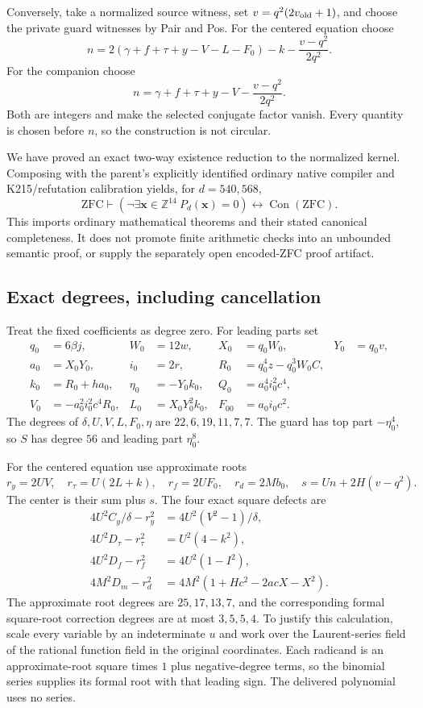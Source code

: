 Conversely, take a normalized source witness, set
$v=q^2(2v_{\rm old}+1)$, and choose the private guard witnesses by Pair
and Pos. For the centered equation choose
\[
 n=2(\gamma+f+\tau+y-V-L-F_0)-k
        -\frac{v-q^2}{2q^2}.
\]
For the companion choose
\[
 n=\gamma+f+\tau+y-V-\frac{v-q^2}{2q^2}.
\]
Both are integers and make the selected conjugate factor vanish. Every
quantity is chosen before $n$, so the construction is not circular.

We have proved an exact two-way existence reduction to the normalized
kernel. Composing with the parent's explicitly identified ordinary native
compiler and K215/refutation calibration yields, for $d=540,568$,
\[
 \mathrm{ZFC}\vdash
 \left(\neg\exists\boldsymbol x\in\mathbb Z^{14}
              \ P_d(\boldsymbol x)=0\right)
 \longleftrightarrow\operatorname{Con}(\mathrm{ZFC}).
\]
This imports ordinary mathematical theorems and their stated canonical
completeness. It does not promote finite arithmetic checks into an unbounded
semantic proof, or supply the separately open encoded-ZFC proof artifact.

\subsection{Exact degrees, including cancellation}

Treat the fixed coefficients as degree zero. For leading parts set
\begin{align*}
 q_0&=6\beta j,&W_0&=12w,&X_0&=q_0W_0,&Y_0&=q_0v,\\
 a_0&=X_0Y_0,&i_0&=2r,&R_0&=q_0^4z-q_0^3W_0C,\\
 k_0&=R_0+ha_0,&\eta_0&=-Y_0k_0,&Q_0&=a_0^4i_0^2c^4,\\
 V_0&=-a_0^2i_0^2c^4R_0,&L_0&=X_0Y_0^2k_0,&F_{00}&=a_0i_0c^2.
\end{align*}
The degrees of $\delta,U,V,L,F_0,\eta$ are $22,6,19,11,7,7$.
The guard has top part $-\eta_0^4$, so $S$ has degree $56$ and
leading part $\eta_0^8$.

For the centered equation use approximate roots
\[
 r_y=2UV,\quad r_\tau=U(2L+k),\quad
 r_f=2UF_0,\quad r_d=2Mb_0,
 \quad s=Un+2H(v-q^2).
\]
The center is their sum plus $s$. The four exact square defects are
\begin{align*}
 4U^2C_y/\delta-r_y^2&=4U^2(V^2-1)/\delta,\\
 4U^2D_\tau-r_\tau^2&=U^2(4-k^2),\\
 4U^2D_f-r_f^2&=4U^2(1-I^2),\\
 4M^2D_m-r_d^2&=4M^2(1+Hc^2-2acX-X^2).
\end{align*}
The approximate root degrees are $25,17,13,7$, and the corresponding
formal square-root correction degrees are at most $3,5,5,4$.
To justify this calculation, scale every variable by an indeterminate $u$
and work over the Laurent-series field of the rational function field in
the original coordinates. Each radicand is an approximate-root square
times $1$ plus negative-degree terms, so the binomial series supplies its
formal root with that leading sign. The delivered polynomial uses no series.

